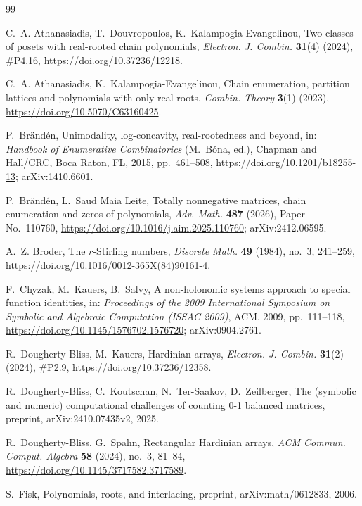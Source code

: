 \documentclass[11pt]{amsart}
\theoremstyle{definition}
\begin{document}
\begin{thebibliography}{99}

C.~A. Athanasiadis, T.~Douvropoulos, K.~Kalampogia-Evangelinou, Two classes of posets with real-rooted chain polynomials, \emph{Electron. J. Combin.} \textbf{31}(4) (2024), \#P4.16, \url{https://doi.org/10.37236/12218}.

C.~A. Athanasiadis, K.~Kalampogia-Evangelinou, Chain enumeration, partition lattices and polynomials with only real roots, \emph{Combin. Theory} \textbf{3}(1) (2023), \url{https://doi.org/10.5070/C63160425}.

P.~Br\"and\'en, Unimodality, log-concavity, real-rootedness and beyond, in: \emph{Handbook of Enumerative Combinatorics} (M.~B\'ona, ed.), Chapman and Hall/CRC, Boca Raton, FL, 2015, pp.~461--508, \url{https://doi.org/10.1201/b18255-13}; arXiv:1410.6601.

P.~Br\"and\'en, L.~Saud Maia Leite, Totally nonnegative matrices, chain enumeration and zeros of polynomials, \emph{Adv. Math.} \textbf{487} (2026), Paper No.~110760, \url{https://doi.org/10.1016/j.aim.2025.110760}; arXiv:2412.06595.

A.~Z. Broder, The $r$-Stirling numbers, \emph{Discrete Math.} \textbf{49} (1984), no.~3, 241--259, \url{https://doi.org/10.1016/0012-365X(84)90161-4}.

F.~Chyzak, M.~Kauers, B.~Salvy, A non-holonomic systems approach to special function identities, in: \emph{Proceedings of the 2009 International Symposium on Symbolic and Algebraic Computation (ISSAC 2009)}, ACM, 2009, pp.~111--118, \url{https://doi.org/10.1145/1576702.1576720}; arXiv:0904.2761.

R.~Dougherty-Bliss, M.~Kauers, Hardinian arrays, \emph{Electron. J. Combin.} \textbf{31}(2) (2024), \#P2.9, \url{https://doi.org/10.37236/12358}.

R.~Dougherty-Bliss, C.~Koutschan, N.~Ter-Saakov, D.~Zeilberger, The (symbolic and numeric) computational challenges of counting 0-1 balanced matrices, preprint, arXiv:2410.07435v2, 2025.

R.~Dougherty-Bliss, G.~Spahn, Rectangular Hardinian arrays, \emph{ACM Commun. Comput. Algebra} \textbf{58} (2024), no.~3, 81--84, \url{https://doi.org/10.1145/3717582.3717589}.

S.~Fisk, Polynomials, roots, and interlacing, preprint, arXiv:math/0612833, 2006.


\end{thebibliography}
\end{document}
